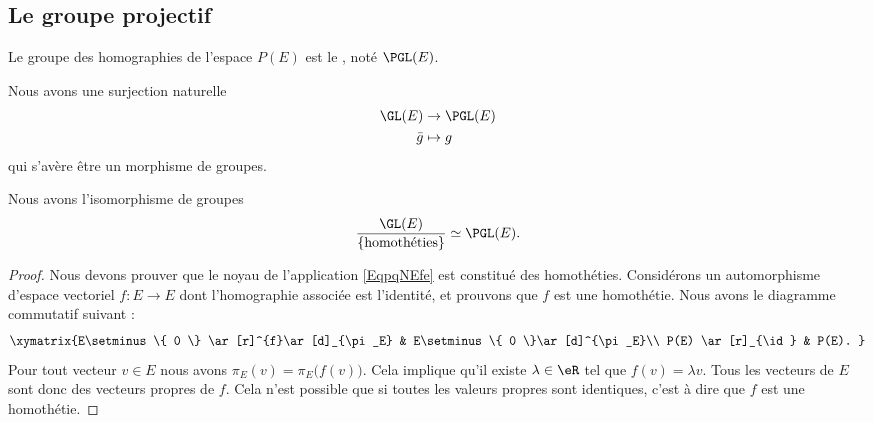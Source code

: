 \subsection{Le groupe projectif}

\begin{definition}
    Le groupe des homographies de l'espace \( P(E)\) est le , noté \( \PGL(E)\).
\end{definition}

Nous avons une surjection naturelle
\begin{equation}        \label{EqpqNEfe}
    \begin{aligned}
         \GL(E)&\to \PGL(E) \\
        \bar g&\mapsto g 
    \end{aligned}
\end{equation}
qui s'avère être un morphisme de groupes.

\begin{proposition}
    Nous avons l'isomorphisme de groupes
    \begin{equation}
        \frac{ \GL(E) }{\{  \text{homothéties} \}}\simeq \PGL(E).
    \end{equation}
    
\end{proposition}

\begin{proof}
    Nous devons prouver que le noyau de l'application \eqref{EqpqNEfe} est constitué des homothéties. Considérons un automorphisme d'espace vectoriel \( f\colon E\to E\) dont l'homographie associée est l'identité, et prouvons que \( f\) est une homothétie. Nous avons le diagramme commutatif suivant :
    \begin{equation}
        \xymatrix{%
        E\setminus\{ 0 \} \ar[r]^{f}\ar[d]_{\pi_E}        &   E\setminus\{ 0 \}\ar[d]^{\pi_E}\\
           P(E) \ar[r]_{\id}   &   P(E).
           }
    \end{equation}
    Pour tout vecteur \( v\in E\) nous avons \( \pi_E(v)=\pi_E\big( f(v) \big)\). Cela implique qu'il existe \( \lambda\in\eR\) tel que \( f(v)=\lambda v\). Tous les vecteurs de \( E\) sont donc des vecteurs propres de \( f\). Cela n'est possible que si toutes les valeurs propres sont identiques, c'est à dire que \( f\) est une homothétie.
\end{proof}

